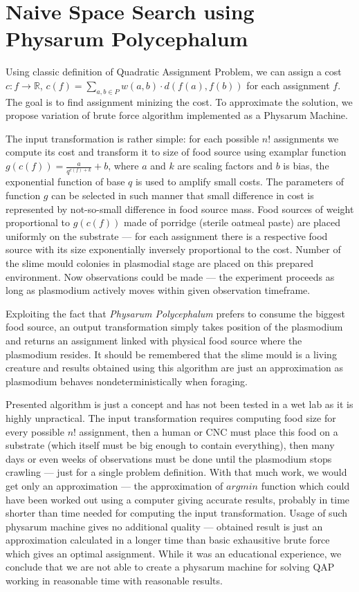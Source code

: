 \section{Naive Space Search using Physarum Polycephalum}
\label{section:algorithm_naive}

Using classic definition of Quadratic Assignment Problem, we can assign a cost $c : f \rightarrow \mathbb{R}$, $c(f) = \sum_{a,b\in P}w(a,b)\cdot d(f(a), f(b))$ for each assignment $f$. The goal is to find assignment minizing the cost. To approximate the solution, we propose variation of brute force algorithm implemented as a Physarum Machine.

The input transformation is rather simple: for each possible $n!$ assignments we compute its cost and transform it to size of food source using examplar function $g(c(f)) = \frac{a}{q^{c(f)+k}}+b$, where $a$ and $k$ are scaling factors and $b$ is bias, the exponential function of base $q$ is used to amplify small costs. The parameters of function $g$ can be selected in such manner that small difference in cost is represented by not-so-small difference in food source mass. Food sources of weight proportional to $g(c(f))$ made of porridge (sterile oatmeal paste) are placed uniformly on the substrate --- for each assignment there is a respective food source with its size exponentially inversely proportional to the cost. Number of the slime mould colonies in plasmodial stage are placed on this prepared environment. Now observations could be made --- the experiment proceeds as long as plasmodium actively moves within given observation timeframe. 

Exploiting the fact that \textit{Physarum Polycephalum} prefers to consume the biggest food source, an output transformation simply takes position of the plasmodium and returns an assignment linked with physical food source where the plasmodium resides. It should be remembered that the slime mould is a living creature and results obtained using this algorithm are just an approximation as plasmodium behaves nondeterministically when foraging.

Presented algorithm is just a concept and has not been tested in a wet lab as it is highly unpractical. The input transformation requires computing food size for every possible $n!$ assignment, then a human or CNC must place this food on a substrate (which itself must be big enough to contain everything), then many days or even weeks of observations must be done until the plasmodium stops crawling --- just for a single problem definition. With that much work, we would get only an approximation --- the approximation of $argmin$ function which could have been worked out using a computer giving accurate results, probably in time shorter than time needed for computing the input transformation. Usage of such physarum machine gives no additional quality --- obtained result is just an approximation calculated in a longer time than basic exhausitive brute force which gives an optimal assignment. While it was an educational experience, we conclude that we are not able to create a physarum machine for solving QAP working in reasonable time with reasonable results.
